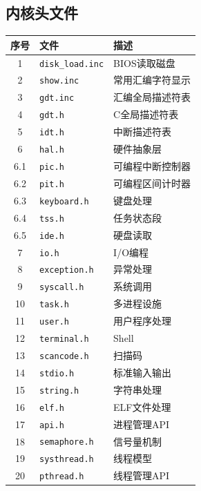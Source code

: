 \documentclass[logo,reportComp]{thesis}
\begin{document}
\subsection{内核头文件}
\begin{center}
\begin{tabular}{|c|l|l|}\hline
\textbf{序号} & \textbf{文件} & \textbf{描述} \\\hline
1 & \verb'disk_load.inc' & BIOS读取磁盘\\\hline
2 & \verb'show.inc' & 常用汇编字符显示\\\hline
3 & \verb'gdt.inc' & 汇编全局描述符表\\\hline
4 & \verb'gdt.h' & C全局描述符表\\\hline
5 & \verb'idt.h' & 中断描述符表\\\hline
6 & \verb'hal.h' & 硬件抽象层\\\hline
6.1 & \verb'pic.h' & 可编程中断控制器\\\hline
6.2 & \verb'pit.h' & 可编程区间计时器\\\hline
6.3 & \verb'keyboard.h' & 键盘处理\\\hline
6.4 & \verb'tss.h' & 任务状态段\\\hline
6.5 & \verb'ide.h' & 硬盘读取\\\hline
7 & \verb'io.h' & I/O编程\\\hline
8 & \verb'exception.h' & 异常处理\\\hline
9 & \verb'syscall.h' & 系统调用\\\hline
10 & \verb'task.h' & 多进程设施\\\hline
11 & \verb'user.h' & 用户程序处理\\\hline
12 & \verb'terminal.h' & Shell\\\hline
13 & \verb'scancode.h' & 扫描码\\\hline
14 & \verb'stdio.h' & 标准输入输出\\\hline
15 & \verb'string.h' & 字符串处理\\\hline
16 & \verb'elf.h' & ELF文件处理\\\hline
17 & \verb'api.h' & 进程管理API\\\hline
18 & \verb'semaphore.h' & 信号量机制\\\hline
19 & \verb'systhread.h' & 线程模型\\\hline
20 & \verb'pthread.h' & 线程管理API\\\hline
\end{tabular}
\end{center}
\end{document}
